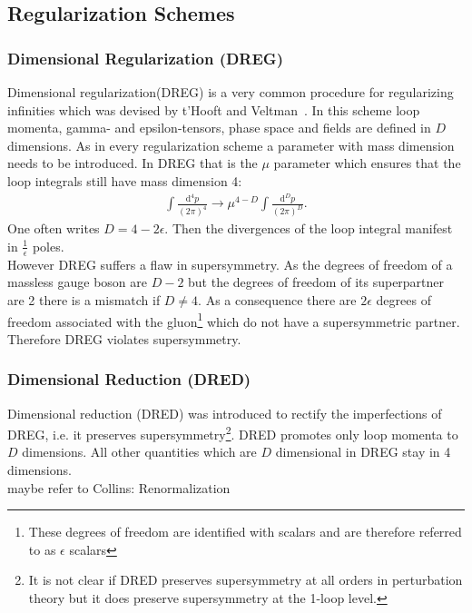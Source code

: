 \subsection{Regularization Schemes}\label{sec:RegSchemes}
\subsubsection*{Dimensional Regularization (DREG)}
Dimensional regularization(DREG) is a very common procedure for regularizing infinities which was devised by t'Hooft and Veltman~\cite{'tHooft:1972fi}. In this scheme loop momenta, gamma- and epsilon-tensors, phase space and fields are defined in $D$ dimensions. As in every regularization scheme a parameter with mass dimension needs to be introduced. In DREG that is the $\mu$ parameter which ensures that the loop integrals still have mass dimension 4:
\begin{align}
\int \frac{\mbox{d}^4p}{(2\pi)^4} \to \mu^{4-D} \int \frac{\mbox{d}^Dp}{(2\pi)^D}.
\end{align}
One often writes $D=4-2\epsilon$. Then the divergences of the loop integral manifest in $\frac{1}{\epsilon}$ poles.\\
However DREG suffers a flaw in supersymmetry. As the degrees of freedom of a massless gauge boson are $D-2$ but the degrees of freedom of its superpartner are 2 there is a mismatch if $D \neq 4$. As a consequence there are $2\epsilon$ degrees of freedom associated with the gluon\footnote{These degrees of freedom are identified with scalars and are therefore referred to as $\epsilon$ scalars} which do not have a supersymmetric partner. Therefore DREG violates supersymmetry.

\subsubsection*{Dimensional Reduction (DRED)}
Dimensional reduction (DRED) was introduced to rectify the imperfections of DREG, i.e. it preserves supersymmetry\footnote{It is not clear if DRED preserves supersymmetry at all orders in perturbation theory but it does preserve supersymmetry at the 1-loop level.}. DRED promotes only loop momenta to $D$ dimensions. All other quantities which are $D$ dimensional in DREG stay in 4 dimensions.\\
maybe refer to Collins: Renormalization


